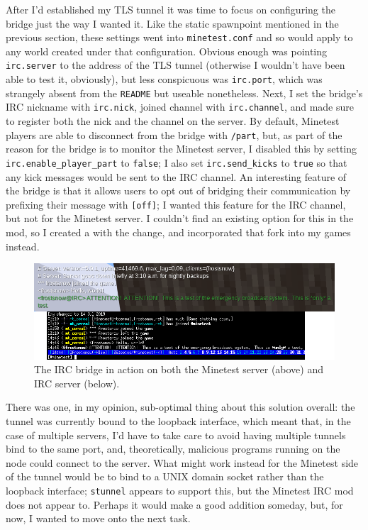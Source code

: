 \documentclass{article}
\begin{document}
After I'd established my TLS tunnel it was time to focus on configuring the bridge just the way I wanted it.  Like the static spawnpoint mentioned in the previous section, these settings went into \texttt{minetest.conf} and so would apply to any world created under that configuration.  Obvious enough was pointing \texttt{irc.server} to the address of the TLS tunnel (otherwise I wouldn't have been able to test it, obviously), but less conspicuous was \texttt{irc.port}, which was strangely absent from the \texttt{README} but useable nonetheless.  Next, I set the bridge's IRC nickname with \texttt{irc.nick}, joined channel with \texttt{irc.channel}, and made sure to register both the nick and the channel on the server.  By default, Minetest players are able to disconnect from the bridge with \texttt{/part}, but, as part of the reason for the bridge is to monitor the Minetest server, I disabled this by setting \texttt{irc.enable_player_part} to \texttt{false}; I also set \texttt{irc.send_kicks} to \texttt{true} so that any kick messages would be sent to the IRC channel.  An interesting feature of the bridge is that it allows users to opt out of bridging their communication by prefixing their message with \verb|[off]|; I wanted this feature for the IRC channel, but not for the Minetest server.  I couldn't find an existing option for this in the mod, so I created a  with the change, and incorporated that fork into my games instead.

\begin{figure}
\begin{center}
\includegraphics{files/blog/2019_07_20_minetest_5_0_1_upgrade_and_server_hosting/2019_07_20_irc_bridge.png}
\caption{The IRC bridge in action on both the Minetest server (above) and IRC server (below).}
\end{center}
\end{figure}

There was one, in my opinion, sub-optimal thing about this solution overall: the tunnel was currently bound to the loopback interface, which meant that, in the case of multiple servers, I'd have to take care to avoid having multiple tunnels bind to the same port, and, theoretically, malicious programs running on the node could connect to the server.  What might work instead for the Minetest side of the tunnel would be to bind to a UNIX domain socket rather than the loopback interface; \texttt{stunnel} appears to support this, but the Minetest IRC mod does not appear to.  Perhaps it would make a good addition someday, but, for now, I wanted to move onto the next task.
\end{document}
